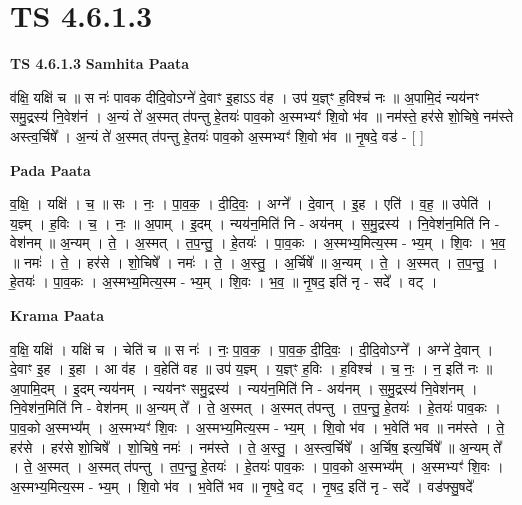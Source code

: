 \documentclass[17pt]{extarticle}
\begin{document}
\section{ TS 4.6.1.3 }

\textbf{TS 4.6.1.3 } \newline
\textbf{Samhita Paata} \newline

व॑क्षि॒ यक्षि॑ च ॥ स नः॑ पावक दीदि॒वोऽग्ने॑ दे॒वाꣳ इ॒हाऽऽ व॑ह । उप॑ य॒ज्ञ्ꣳ ह॒विश्च॑ नः ॥ अ॒पामि॒दं न्यय॑नꣳ समु॒द्रस्य॑ नि॒वेश॑नं । अ॒न्यं ते॑ अ॒स्मत् त॑पन्तु हे॒तयः॑ पाव॒को अ॒स्मभ्यꣳ॑ शि॒वो भ॑व ॥ नम॑स्ते॒ हर॑से शो॒चिषे॒ नम॑स्ते अस्त्व॒र्चिषे᳚ । अ॒न्यं ते॑ अ॒स्मत् त॑पन्तु हे॒तयः॑ पाव॒को अ॒स्मभ्यꣳ॑ शि॒वो भ॑व ॥ नृ॒षदे॒ वड॑ - [  ] \newline

\textbf{Pada Paata} \newline

व॒क्षि॒ । यक्षि॑ । च॒ ॥ सः । नः॒ । पा॒व॒क॒ । दी॒दि॒वः॒ । अग्ने᳚ । दे॒वान् । इ॒ह । एति॑ । व॒ह॒ ॥ उपेति॑ । य॒ज्ञ्म् । ह॒विः । च॒ । नः॒ ॥ अ॒पाम् । इ॒दम् । न्यय॑न॒मिति॑ नि - अय॑नम् । स॒मु॒द्रस्य॑ । नि॒वेश॑न॒मिति॑ नि - वेश॑नम् ॥ अ॒न्यम् । ते॒ । अ॒स्मत् । त॒प॒न्तु॒ । हे॒तयः॑ । पा॒व॒कः । अ॒स्मभ्य॒मित्य॒स्म - भ्य॒म् । शि॒वः । भ॒व॒ ॥ नमः॑ । ते॒ । हर॑से । शो॒चिषे᳚ । नमः॑ । ते॒ । अ॒स्तु॒ । अ॒र्चिषे᳚ ॥ अ॒न्यम् । ते॒ । अ॒स्मत् । त॒प॒न्तु॒ । हे॒तयः॑ । पा॒व॒कः । अ॒स्मभ्य॒मित्य॒स्म - भ्य॒म् । शि॒वः । भ॒व॒ ॥ नृ॒षद॒ इति॑ नृ - सदे᳚ । वट् ।  \newline


\textbf{Krama Paata} \newline

व॒क्षि॒ यक्षि॑ । यक्षि॑ च । चेति॑ च ॥ स नः॑ । नः॒ पा॒व॒क॒ । पा॒व॒क॒ दी॒दि॒वः॒ । दी॒दि॒वोऽग्ने᳚ । अग्ने॑ दे॒वान् । दे॒वाꣳ इ॒ह । इ॒हा । आ व॑ह । व॒हेति॑ वह ॥ उप॑ य॒ज्ञ्म् । य॒ज्ञ्ꣳ ह॒विः । ह॒विश्च॑ । च॒ नः॒ । न॒ इति॑ नः ॥ अ॒पामि॒दम् । इ॒दम् न्यय॑नम् । न्यय॑नꣳ समु॒द्रस्य॑ । न्यय॑न॒मिति॑ नि - अय॑नम् । स॒मु॒द्रस्य॑ नि॒वेश॑नम् । नि॒वेश॑न॒मिति॑ नि - वेश॑नम् ॥ अ॒न्यम् ते᳚ । ते॒ अ॒स्मत् । अ॒स्मत् त॑पन्तु । त॒प॒न्तु॒ हे॒तयः॑ । हे॒तयः॑ पाव॒कः । पा॒व॒को अ॒स्मभ्य᳚म् । अ॒स्मभ्यꣳ॑ शि॒वः । अ॒स्मभ्य॒मित्य॒स्म - भ्य॒म् । शि॒वो भ॑व । भ॒वेति॑ भव ॥ नम॑स्ते । ते॒ हर॑से । हर॑से शो॒चिषे᳚ । शो॒चिषे॒ नमः॑ । नम॑स्ते । ते॒ अ॒स्तु॒ । अ॒स्त्व॒र्चिषे᳚ । अ॒र्चिष॒ इत्य॒र्चिषे᳚ ॥ अ॒न्यम् ते᳚ । ते॒ अ॒स्मत् । अ॒स्मत् त॑पन्तु । त॒प॒न्तु॒ हे॒तयः॑ । हे॒तयः॑ पाव॒कः । पा॒व॒को अ॒स्मभ्य᳚म् । अ॒स्मभ्यꣳ॑ शि॒वः । अ॒स्मभ्य॒मित्य॒स्म - भ्य॒म् । शि॒वो भ॑व । भ॒वेति॑ भव ॥ नृ॒षदे॒ वट् । नृ॒षद॒ इति॑ नृ - सदे᳚ । वड॑फ्सु॒षदे᳚ \newline
\end{document}
